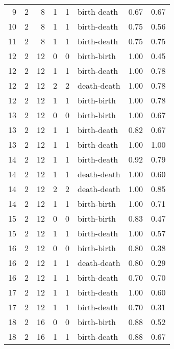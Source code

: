 \documentclass{article}
\begin{document}
\begin{center}
\begin{tabular}{rrrrrlrr}
9 & 2 & 8 & 1 & 1 & birth-death & 0.67 & 0.67 \\
10 & 2 & 8 & 1 & 1 & birth-death & 0.75 & 0.56 \\
11 & 2 & 8 & 1 & 1 & birth-death & 0.75 & 0.75 \\
12 & 2 & 12 & 0 & 0 & birth-birth & 1.00 & 0.45 \\
12 & 2 & 12 & 1 & 1 & birth-death & 1.00 & 0.78 \\
12 & 2 & 12 & 2 & 2 & death-death & 1.00 & 0.78 \\
12 & 2 & 12 & 1 & 1 & birth-birth & 1.00 & 0.78 \\
13 & 2 & 12 & 0 & 0 & birth-birth & 1.00 & 0.67 \\
13 & 2 & 12 & 1 & 1 & birth-death & 0.82 & 0.67 \\
13 & 2 & 12 & 1 & 1 & birth-death & 1.00 & 1.00 \\
14 & 2 & 12 & 1 & 1 & birth-death & 0.92 & 0.79 \\
14 & 2 & 12 & 1 & 1 & death-death & 1.00 & 0.60 \\
14 & 2 & 12 & 2 & 2 & death-death & 1.00 & 0.85 \\
14 & 2 & 12 & 1 & 1 & birth-birth & 1.00 & 0.71 \\
15 & 2 & 12 & 0 & 0 & birth-birth & 0.83 & 0.47 \\
15 & 2 & 12 & 1 & 1 & birth-death & 1.00 & 0.57 \\
16 & 2 & 12 & 0 & 0 & birth-birth & 0.80 & 0.38 \\
16 & 2 & 12 & 1 & 1 & death-death & 0.80 & 0.29 \\
16 & 2 & 12 & 1 & 1 & birth-death & 0.70 & 0.70 \\
17 & 2 & 12 & 1 & 1 & birth-death & 1.00 & 0.60 \\
17 & 2 & 12 & 1 & 1 & birth-death & 0.70 & 0.31 \\
18 & 2 & 16 & 0 & 0 & birth-birth & 0.88 & 0.52 \\
18 & 2 & 16 & 1 & 1 & birth-death & 0.88 & 0.67 \\
\bottomrule
\end{tabular}


\end{center}
\end{document}
